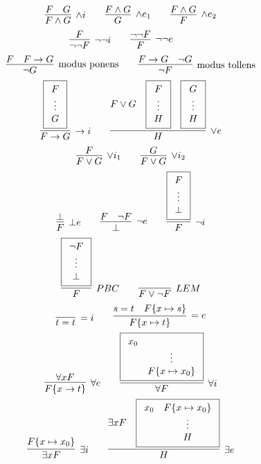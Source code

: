\begin{table}[hbt]
\begin{gather*}
	\infer[\land i]{F\land G}{F & G} \qquad
	\infer[\land e_1]{G}{F \land G} \qquad
	\infer[\land e_2]{F}{F \land G} 
	\\
	\infer[\lnot\lnot i]{\lnot\lnot F}{F} \qquad
	\infer[\lnot\lnot e]{F}{\lnot\lnot F} \qquad
	\\
	\infer[\text{modus ponens}]{\lnot G}{F & F\limp G}
		\qquad
	\infer[\text{modus tollens}]{\lnot F}{F\limp G & \lnot G}
	\\
	\infer[\limp i]{F\limp G}{
	\boxed{\begin{array}{c}F\\\vdots\\G\end{array}
	}}
\qquad
\infer[\lor e]{H}{
	F\lor G &
	\boxed{\begin{array}{c}F\\\vdots\\H\end{array}} &
	\boxed{\begin{array}{c}G\\\vdots\\H\end{array}}
}
\\
\infer[\lor i_1]{F\lor G}{F}
	\qquad
\infer[\lor i_2]{F\lor G}{G}
\\
\infer[\bot e]{F}{\bot}
\qquad
\infer[\lnot e]{\bot}{F & \lnot F}
\qquad
\infer[\lnot i]{F}{
	\boxed{\begin{array}{c}F\\\vdots\\\bot\end{array}}}
\\
\infer[PBC]{F}{
	\boxed{\begin{array}{c}\lnot F\\\vdots\\\bot\end{array}}}
\qquad
\infer[LEM]{F\lor\lnot F}{}
\\
\infer[=i]{t=t}{}
\qquad
\infer[=e]{F\{x\mapsto t\}}{s=t & F\{x\mapsto s\}}
\\
\infer[\forall e]{F\{x\to t\}}{
	\forall x F
}
\qquad
\infer[\forall i]{\forall F}{
	\boxed{\begin{array}{cc}x_0\\&\vdots\\&F\{x\mapsto x_0\}\end{array}}
}
\\
\infer[\exists i]{\exists x F}{
	F\{x\mapsto x_0 \}
}
\qquad
\infer[\exists e]{H}{
	\exists x F &
	\boxed{\begin{array}{cc}x_0&F\{x\mapsto x_0 \}\\&\vdots\\&H\end{array}}
}
\end{gather*}
\end{table}